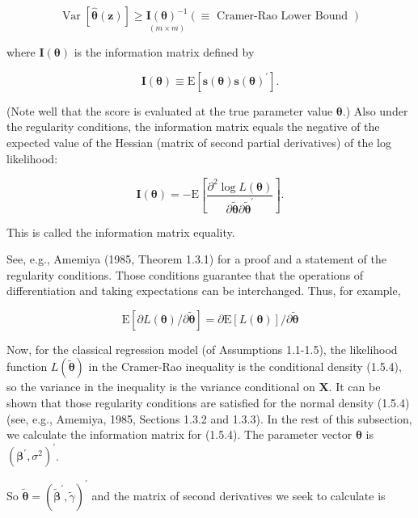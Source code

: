 \documentclass[10pt]{article}
\begin{document}
$$
\operatorname{Var}[\hat{\boldsymbol{\theta}}(\mathbf{z})] \geq \underset{(m \times m)}{\mathbf{I}(\boldsymbol{\theta})^{-1}}(\equiv \text { Cramer-Rao Lower Bound })
$$

where $\mathbf{I}(\boldsymbol{\theta})$ is the information matrix defined by


\begin{equation*}
\mathbf{I}(\boldsymbol{\theta}) \equiv \mathrm{E}\left[\mathbf{s}(\boldsymbol{\theta}) \mathbf{s}(\boldsymbol{\theta})^{\prime}\right] . \tag{1.5.10}
\end{equation*}


(Note well that the score is evaluated at the true parameter value $\boldsymbol{\theta}$.) Also under the regularity conditions, the information matrix equals the negative of the expected value of the Hessian (matrix of second partial derivatives) of the log likelihood:


\begin{equation*}
\mathbf{I}(\boldsymbol{\theta})=-\mathrm{E}\left[\frac{\partial^{2} \log L(\boldsymbol{\theta})}{\partial \tilde{\boldsymbol{\theta}} \partial \tilde{\boldsymbol{\theta}}^{\prime}}\right] . \tag{1.5.11}
\end{equation*}


This is called the information matrix equality.

See, e.g., Amemiya (1985, Theorem 1.3.1) for a proof and a statement of the regularity conditions. Those conditions guarantee that the operations of differentiation and taking expectations can be interchanged. Thus, for example,

$$
\mathrm{E}[\partial L(\boldsymbol{\theta}) / \partial \tilde{\boldsymbol{\theta}}]=\partial \mathrm{E}[L(\boldsymbol{\theta})] / \partial \tilde{\boldsymbol{\theta}}
$$

Now, for the classical regression model (of Assumptions 1.1-1.5), the likelihood function $L(\tilde{\boldsymbol{\theta}})$ in the Cramer-Rao inequality is the conditional density (1.5.4), so the variance in the inequality is the variance conditional on $\mathbf{X}$. It can be shown that those regularity conditions are satisfied for the normal density (1.5.4) (see, e.g., Amemiya, 1985, Sections 1.3.2 and 1.3.3). In the rest of this subsection, we calculate the information matrix for (1.5.4). The parameter vector $\boldsymbol{\theta}$ is $\left(\boldsymbol{\beta}^{\prime}, \sigma^{2}\right)^{\prime}$.

So $\tilde{\boldsymbol{\theta}}=\left(\tilde{\boldsymbol{\beta}}^{\prime}, \tilde{\gamma}\right)^{\prime}$ and the matrix of second derivatives we seek to calculate is
\end{document}
